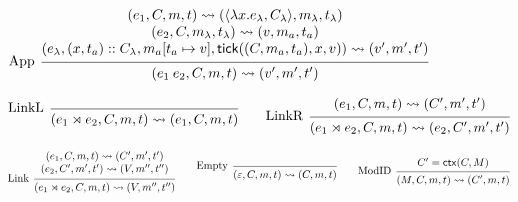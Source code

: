 \documentclass{article}
\theoremstyle{definition}
\newcommand*{\cons}{::}
\newcommand*{\mem}{m}
\newcommand*{\semarrow}{\rightsquigarrow}
\newcommand*{\link}[2]{{#1}\rtimes{#2}}
\newcommand*{\tick}{\mathsf{tick}}
\newcommand*{\modctx}{\mathsf{ctx}}
\begin{document}
\begin{figure}[h!]
  \[
    \begin{prooftree}
      \hypo{
        \begin{matrix}
          (e_{1}, C, \mem, t)
          \semarrow
          (\langle\lambda x.e_{\lambda}, C_{\lambda}\rangle, \mem_{\lambda}, t_{\lambda}) \\
          (e_{2}, C, \mem_{\lambda}, t_{\lambda})
          \semarrow
          (v, \mem_{a}, t_{a})                                                            \\
          (e_{\lambda}, (x, t_{a})\cons C_{\lambda}, \mem_{a}[t_{a}\mapsto v], \tick((C,\mem_{a},t_{a}),x,v))
          \semarrow
          (v', \mem',t')
        \end{matrix}
      }
      \infer[left label={App}]1{
      (e_{1}\:e_{2}, C, \mem, t)
      \semarrow
      (v', \mem',t')
      }
    \end{prooftree}
  \]

  \[
    \begin{prooftree}
      \infer[left label=LinkL]0{
      (\link{e_{1}}{e_{2}}, C, \mem, t)
      \semarrow
      (e_{1}, C, \mem, t)
      }
    \end{prooftree}\qquad
    \begin{prooftree}
      \hypo{
        \begin{matrix}
          (e_{1}, C, \mem, t)
          \semarrow
          (C', \mem', t')
        \end{matrix}
      }
      \infer[left label=LinkR]1{
      (\link{e_{1}}{e_{2}}, C, \mem, t)
      \semarrow
      (e_{2}, C', \mem', t')
      }
    \end{prooftree}
  \]

  \[
    \begin{prooftree}
      \hypo{
        \begin{matrix}
          (e_{1}, C, \mem, t)
          \semarrow
          (C', \mem', t') \\
          (e_{2}, C', \mem', t')
          \semarrow
          (V, \mem'', t'')
        \end{matrix}
      }
      \infer[left label=Link]1{
      (\link{e_{1}}{e_{2}}, C, \mem, t)
      \semarrow
      (V, \mem'', t'')
      }
    \end{prooftree}\qquad
    \begin{prooftree}
      \infer[left label=Empty]0{
      (\varepsilon, C, \mem, t)
      \semarrow
      (C, \mem, t)
      }
    \end{prooftree}\qquad
    \begin{prooftree}
      \hypo{C'=\modctx(C,M)}
      \infer[left label=ModID]1{
      (M, C, \mem, t)
      \semarrow
      (C', \mem, t)
      }
    \end{prooftree}
  \]


\end{figure}
\end{document}
